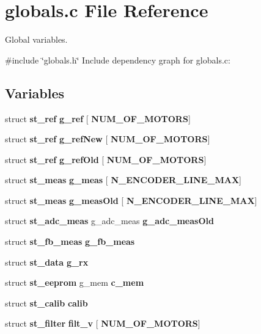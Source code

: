 \section{globals.\+c File Reference}
\label{globals_8c}


Global variables.  


{\ttfamily \#include \char`\"{}globals.\+h\char`\"{}}\newline
Include dependency graph for globals.\+c\+:
\subsection*{Variables}
\begin{DoxyCompactItemize}
\item 
\mbox{\label{globals_8c_a975e5cde4f157d8bbdbde3c03227f3de}} 
struct \textbf{ st\+\_\+ref} {\bfseries g\+\_\+ref} [\textbf{ N\+U\+M\+\_\+\+O\+F\+\_\+\+M\+O\+T\+O\+RS}]
\item 
\mbox{\label{globals_8c_ab40c607c340b011a96046994f4b2229c}} 
struct \textbf{ st\+\_\+ref} {\bfseries g\+\_\+ref\+New} [\textbf{ N\+U\+M\+\_\+\+O\+F\+\_\+\+M\+O\+T\+O\+RS}]
\item 
struct \textbf{ st\+\_\+ref} \textbf{ g\+\_\+ref\+Old} [\textbf{ N\+U\+M\+\_\+\+O\+F\+\_\+\+M\+O\+T\+O\+RS}]
\item 
\mbox{\label{globals_8c_a6f0c00c1300c30d398231d1e76f3f780}} 
struct \textbf{ st\+\_\+meas} {\bfseries g\+\_\+meas} [\textbf{ N\+\_\+\+E\+N\+C\+O\+D\+E\+R\+\_\+\+L\+I\+N\+E\+\_\+\+M\+AX}]
\item 
struct \textbf{ st\+\_\+meas} \textbf{ g\+\_\+meas\+Old} [\textbf{ N\+\_\+\+E\+N\+C\+O\+D\+E\+R\+\_\+\+L\+I\+N\+E\+\_\+\+M\+AX}]
\item 
struct \textbf{ st\+\_\+adc\+\_\+meas} g\+\_\+adc\+\_\+meas \textbf{ g\+\_\+adc\+\_\+meas\+Old}
\item 
struct \textbf{ st\+\_\+fb\+\_\+meas} \textbf{ g\+\_\+fb\+\_\+meas}
\item 
struct \textbf{ st\+\_\+data} \textbf{ g\+\_\+rx}
\item 
struct \textbf{ st\+\_\+eeprom} g\+\_\+mem \textbf{ c\+\_\+mem}
\item 
struct \textbf{ st\+\_\+calib} \textbf{ calib}
\item 
\mbox{\label{globals_8c_a0e9a576515332f8bd83ae6a2fe0164aa}} 
struct \textbf{ st\+\_\+filter} {\bfseries filt\+\_\+v} [\textbf{ N\+U\+M\+\_\+\+O\+F\+\_\+\+M\+O\+T\+O\+RS}]
\item 
\mbox{\label{globals_8c_a503852d956ef1e03f4a9d8b91db248fc}} 

\end{DoxyCompactItemize}

